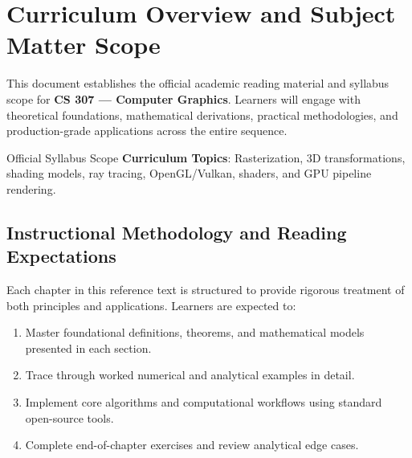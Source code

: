 \section{Curriculum Overview and Subject Matter Scope}

This document establishes the official academic reading material and syllabus scope for \textbf{CS 307 --- Computer Graphics}. Learners will engage with theoretical foundations, mathematical derivations, practical methodologies, and production-grade applications across the entire sequence.

\begin{InsightBox}{Official Syllabus Scope}
  \textbf{Curriculum Topics}: Rasterization, 3D transformations, shading models, ray tracing, OpenGL/Vulkan, shaders, and GPU pipeline rendering.
\end{InsightBox}

\subsection{Instructional Methodology and Reading Expectations}

Each chapter in this reference text is structured to provide rigorous treatment of both principles and applications. Learners are expected to:
\begin{enumerate}
  \item Master foundational definitions, theorems, and mathematical models presented in each section.
  \item Trace through worked numerical and analytical examples in detail.
  \item Implement core algorithms and computational workflows using standard open-source tools.
  \item Complete end-of-chapter exercises and review analytical edge cases.
\end{enumerate}

